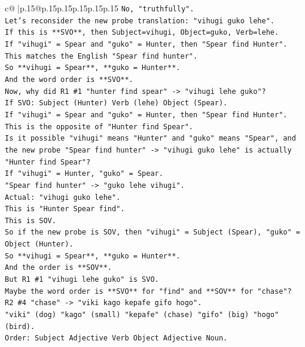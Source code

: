 \documentclass{article}
\begin{document}
{\begin{supertabular}{c@{$\;$}|p{.15\linewidth}@{}p{.15\linewidth}p{.15\linewidth}p{.15\linewidth}p{.15\linewidth}p{.15\linewidth}}
{{{\texttt{No, "truthfully".} \\
\texttt{Let's reconsider the new probe translation: "vihugi guko lehe".} \\
\texttt{If this is **SVO**, then Subject=vihugi, Object=guko, Verb=lehe.} \\
\texttt{If "vihugi" = Spear and "guko" = Hunter, then "Spear find Hunter".} \\
\texttt{This matches the English "Spear find hunter".} \\
\texttt{So **vihugi = Spear**, **guko = Hunter**.} \\
\texttt{And the word order is **SVO**.} \\
\texttt{Now, why did R1 \#1 "hunter find spear" {-}> "vihugi lehe guko"?} \\
\texttt{If SVO: Subject (Hunter) Verb (lehe) Object (Spear).} \\
\texttt{If "vihugi" = Spear and "guko" = Hunter, then "Spear find Hunter".} \\
\texttt{This is the opposite of "Hunter find Spear".} \\
\texttt{Is it possible "vihugi" means "Hunter" and "guko" means "Spear", and the new probe "Spear find hunter" {-}> "vihugi guko lehe" is actually "Hunter find Spear"?} \\
\texttt{If "vihugi" = Hunter, "guko" = Spear.} \\
\texttt{"Spear find hunter" {-}> "guko lehe vihugi".} \\
\texttt{Actual: "vihugi guko lehe".} \\
\texttt{This is "Hunter Spear find".} \\
\texttt{This is SOV.} \\
\texttt{So if the new probe is SOV, then "vihugi" = Subject (Spear), "guko" = Object (Hunter).} \\
\texttt{So **vihugi = Spear**, **guko = Hunter**.} \\
\texttt{And the order is **SOV**.} \\
\texttt{But R1 \#1 "vihugi lehe guko" is SVO.} \\
\texttt{Maybe the word order is **SVO** for "find" and **SOV** for "chase"?} \\
\texttt{R2 \#4 "chase" {-}> "viki kago kepafe gifo hogo".} \\
\texttt{"viki" (dog) "kago" (small) "kepafe" (chase) "gifo" (big) "hogo" (bird).} \\
\texttt{Order: Subject Adjective Verb Object Adjective Noun.} \\
}}}
\end{supertabular}}
\end{document}
